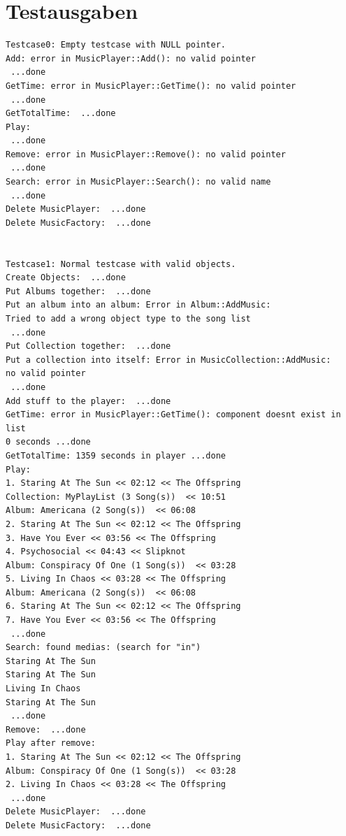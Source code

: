\documentclass[12pt,a4paper]{article}
\begin{document}

\newpage

\newpage


\newpage

\newpage


\newpage

\newpage


\newpage

\newpage


\newpage

\section {Testausgaben} 

\begin {verbatim}
Testcase0: Empty testcase with NULL pointer.
Add: error in MusicPlayer::Add(): no valid pointer
 ...done
GetTime: error in MusicPlayer::GetTime(): no valid pointer
 ...done
GetTotalTime:  ...done
Play:
 ...done
Remove: error in MusicPlayer::Remove(): no valid pointer
 ...done
Search: error in MusicPlayer::Search(): no valid name
 ...done
Delete MusicPlayer:  ...done
Delete MusicFactory:  ...done


Testcase1: Normal testcase with valid objects.
Create Objects:  ...done
Put Albums together:  ...done
Put an album into an album: Error in Album::AddMusic: 
Tried to add a wrong object type to the song list
 ...done
Put Collection together:  ...done
Put a collection into itself: Error in MusicCollection::AddMusic: 
no valid pointer
 ...done
Add stuff to the player:  ...done
GetTime: error in MusicPlayer::GetTime(): component doesnt exist in list
0 seconds ...done
GetTotalTime: 1359 seconds in player ...done
Play:
1. Staring At The Sun << 02:12 << The Offspring
Collection: MyPlayList (3 Song(s))  << 10:51
Album: Americana (2 Song(s))  << 06:08
2. Staring At The Sun << 02:12 << The Offspring
3. Have You Ever << 03:56 << The Offspring
4. Psychosocial << 04:43 << Slipknot
Album: Conspiracy Of One (1 Song(s))  << 03:28
5. Living In Chaos << 03:28 << The Offspring
Album: Americana (2 Song(s))  << 06:08
6. Staring At The Sun << 02:12 << The Offspring
7. Have You Ever << 03:56 << The Offspring
 ...done
Search: found medias: (search for "in")
Staring At The Sun
Staring At The Sun
Living In Chaos
Staring At The Sun
 ...done
Remove:  ...done
Play after remove:
1. Staring At The Sun << 02:12 << The Offspring
Album: Conspiracy Of One (1 Song(s))  << 03:28
2. Living In Chaos << 03:28 << The Offspring
 ...done
Delete MusicPlayer:  ...done
Delete MusicFactory:  ...done
\end {verbatim}
\end{document}
